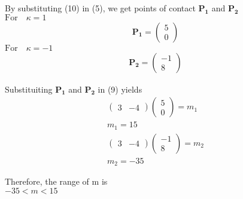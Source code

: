 \documentclass[journal,12pt,twocolumn]{IEEEtran}
\let\vec\mathbf
\begin{document}
By substituting (10) in (5), we get points of contact $\vec{P_1}$ and $\vec{P_2}$\\
$\text{For} \quad \kappa = 1 $
\begin{align}
\vec{P_1} = \begin{pmatrix}
      5 \\
      0
    \end{pmatrix}
    \label{eq-1}
\end{align}
$ \text{For} \quad \kappa = -1 $
\begin{align}
\vec{P_2} = \begin{pmatrix}
     -1  \\
      8
    \end{pmatrix}
\label{eq-2}
\end{align}

Substituiting $\vec{P_1}$ and $\vec{P_2}$ in (9) yields
\begin{align}
\begin{pmatrix}
3 & -4
\end{pmatrix}
\begin{pmatrix}
      5 \\
      0
    \end{pmatrix} = m_1  \\
m_1 = 15    \\
\begin{pmatrix}
3 & -4
\end{pmatrix}
\begin{pmatrix}
      -1 \\
       8
    \end{pmatrix} = m_2  \\
m_2 = -35    
\end{align}

Therefore, the range of m is\\
\vspace{0.2cm}
\centering 
$-35 < m < 15$
\end{document}

